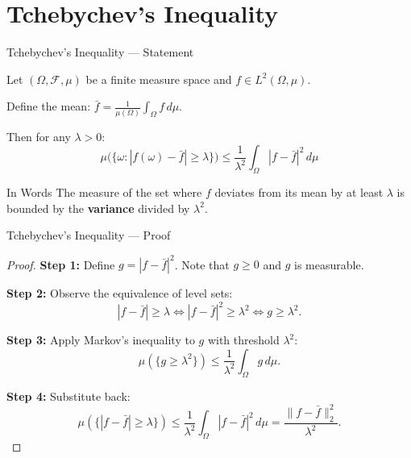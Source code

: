 \documentclass{beamer}
\begin{document}
\section{Tchebychev's Inequality}

\begin{frame}{Tchebychev's Inequality — Statement}
    \begin{theorem}
        Let $(\Omega, \mathscr{F}, \mu)$ be a finite measure space and $f \in L^2(\Omega, \mu)$.

        \vspace{0.2cm}
        Define the mean: $\displaystyle\bar{f} = \frac{1}{\mu(\Omega)} \int_\Omega f \, d\mu$.

        \vspace{0.2cm}
        Then for any $\lambda > 0$:
        \[
            \boxed{\mu\big(\{\omega : |f(\omega) - \bar{f}| \geq \lambda\}\big) \leq \frac{1}{\lambda^2} \int_\Omega |f - \bar{f}|^2 \, d\mu}
        \]
    \end{theorem}

    \vspace{0.3cm}
    \begin{block}{In Words}
        The measure of the set where $f$ deviates from its mean by at least $\lambda$ is bounded by the \textbf{variance} divided by $\lambda^2$.
    \end{block}
\end{frame}

\begin{frame}{Tchebychev's Inequality — Proof}
    \begin{proof}
        \textbf{Step 1:} Define $g = |f - \bar{f}|^2$. Note that $g \geq 0$ and $g$ is measurable.

        \vspace{0.3cm}
        \textbf{Step 2:} Observe the equivalence of level sets:
        \[
            |f - \bar{f}| \geq \lambda \iff |f - \bar{f}|^2 \geq \lambda^2 \iff g \geq \lambda^2.
        \]

        \vspace{0.3cm}
        \textbf{Step 3:} Apply Markov's inequality to $g$ with threshold $\lambda^2$:
        \[
            \mu(\{g \geq \lambda^2\}) \leq \frac{1}{\lambda^2} \int_\Omega g \, d\mu.
        \]

        \vspace{0.3cm}
        \textbf{Step 4:} Substitute back:
        \[
            \mu(\{|f - \bar{f}| \geq \lambda\}) \leq \frac{1}{\lambda^2} \int_\Omega |f - \bar{f}|^2 \, d\mu = \frac{\|f - \bar{f}\|_2^2}{\lambda^2}.
        \]
    \end{proof}
\end{frame}
\end{document}
